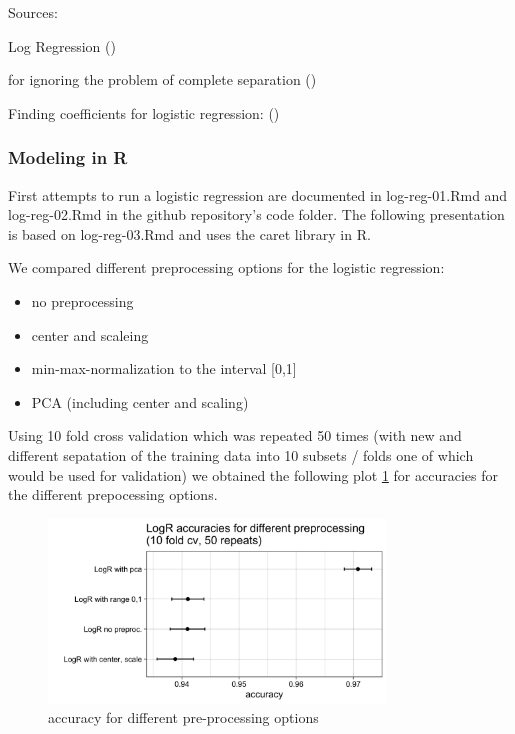 \documentclass[]{article}
\providecommand{\tightlist}{%
  \setlength{\itemsep}{0pt}\setlength{\parskip}{0pt}}
\begin{document}
Sources:

Log Regression (\cite{logreg})

for ignoring the problem of complete separation (\cite{ucla})

Finding coefficients for logistic regression: (\cite{newton})

\subsubsection{Modeling in R}\label{modeling-in-r}

First attempts to run a logistic regression are documented in
log-reg-01.Rmd and log-reg-02.Rmd in the github repository's code
folder. The following presentation is based on log-reg-03.Rmd and uses
the caret library in R.

We compared different preprocessing options for the logistic regression:

\begin{itemize}
\tightlist
\item
  no preprocessing
\item
  center and scaleing
\item
  min-max-normalization to the interval {[}0,1{]}
\item
  PCA (including center and scaling)
\end{itemize}

Using 10 fold cross validation which was repeated 50 times (with new and
different sepatation of the training data into 10 subsets / folds one of
which would be used for validation) we obtained the following plot
\ref{fig:pre-proc-options} for accuracies for the different prepocessing
options.

\begin{figure}
    \centering
    \includegraphics[width=0.8\textwidth]{images/preprocessing-options.png}
    \caption{accuracy for different pre-processing options}
    \label{fig:pre-proc-options}
\end{figure}
\end{document}
